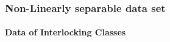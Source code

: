 \documentclass[a4paper]{article}
\begin{document}
	\subsubsection{Non-Linearly separable data set }
		
		\paragraph{Data of Interlocking Classes}
	
\end{document}
